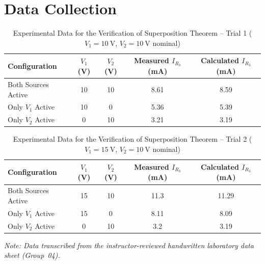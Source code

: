 \section{Data Collection}

\begin{table}[h!]
    \centering
    \caption{Experimental Data for the Verification of Superposition Theorem -- Trial 1 ($V_1=\qty{10}{\volt}$, $V_2=\qty{10}{\volt}$ nominal)}
    \vspace{2mm}
    \begin{tabular}{lcccc}
        \toprule
        \textbf{Configuration} & \textbf{$V_1$ (V)} & \textbf{$V_2$ (V)} & \textbf{Measured $I_{R_3}$ (mA)} & \textbf{Calculated $I_{R_3}$ (mA)} \\
        \midrule
        Both Sources Active & 10 & 10 & 8.61 & 8.59 \\
        Only $V_1$ Active & 10 & 0 & 5.36 & 5.39 \\
        Only $V_2$ Active & 0 & 10 & 3.21 & 3.19 \\
        \bottomrule
    \end{tabular}
    \label{tab:supdata1}
\end{table}

\begin{table}[h!]
    \centering
    \caption{Experimental Data for the Verification of Superposition Theorem -- Trial 2 ($V_1=\qty{15}{\volt}$, $V_2=\qty{10}{\volt}$ nominal)}
    \vspace{2mm}
    \begin{tabular}{lcccc}
        \toprule
        \textbf{Configuration} & \textbf{$V_1$ (V)} & \textbf{$V_2$ (V)} & \textbf{Measured $I_{R_3}$ (mA)} & \textbf{Calculated $I_{R_3}$ (mA)} \\
        \midrule
        Both Sources Active & 15 & 10 & 11.3 & 11.29 \\
        Only $V_1$ Active & 15 & 0 & 8.11 & 8.09 \\
        Only $V_2$ Active & 0 & 10 & 3.2 & 3.19 \\
        \bottomrule
    \end{tabular}
    \label{tab:supdata2}
\end{table}

\textit{Note: Data transcribed from the instructor-reviewed handwritten laboratory data sheet (Group~04).}

